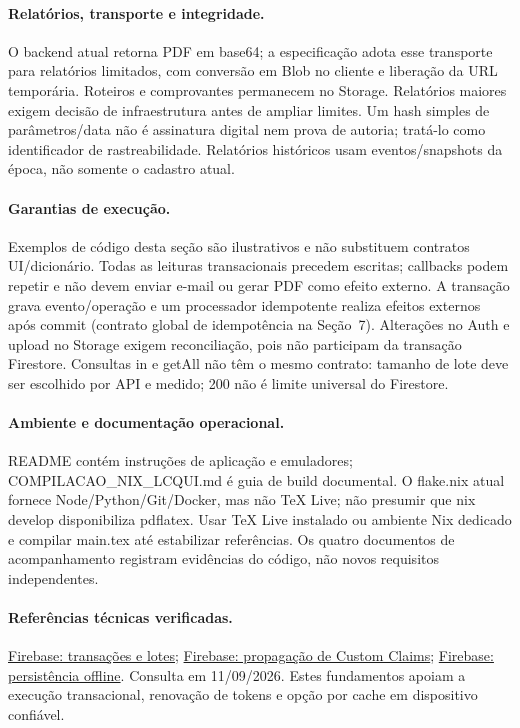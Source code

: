 \paragraph{Relatórios, transporte e integridade.}
O backend atual retorna PDF em base64; a especificação adota esse transporte para relatórios limitados, com conversão em Blob no cliente e liberação da URL temporária. Roteiros e comprovantes permanecem no Storage. Relatórios maiores exigem decisão de infraestrutura antes de ampliar limites. Um hash simples de parâmetros/data não é assinatura digital nem prova de autoria; tratá-lo como identificador de rastreabilidade. Relatórios históricos usam eventos/snapshots da época, não somente o cadastro atual.

\paragraph{Garantias de execução.}
Exemplos de código desta seção são ilustrativos e não substituem contratos UI/dicionário. Todas as leituras transacionais precedem escritas; callbacks podem repetir e não devem enviar e-mail ou gerar PDF como efeito externo. A transação grava evento/operação e um processador idempotente realiza efeitos externos após commit (contrato global de idempotência na Seção~7). Alterações no Auth e upload no Storage exigem reconciliação, pois não participam da transação Firestore. Consultas in e getAll não têm o mesmo contrato: tamanho de lote deve ser escolhido por API e medido; 200 não é limite universal do Firestore.

\paragraph{Ambiente e documentação operacional.}
README contém instruções de aplicação e emuladores; COMPILACAO\_NIX\_LCQUI.md é guia de build documental. O flake.nix atual fornece Node/Python/Git/Docker, mas não TeX Live; não presumir que nix develop disponibiliza pdflatex. Usar TeX Live instalado ou ambiente Nix dedicado e compilar main.tex até estabilizar referências. Os quatro documentos de acompanhamento registram evidências do código, não novos requisitos independentes.

\paragraph{Referências técnicas verificadas.}
\href{https://firebase.google.com/docs/firestore/manage-data/transactions}{Firebase: transações e lotes};
\href{https://firebase.google.com/docs/auth/admin/custom-claims}{Firebase: propagação de Custom Claims};
\href{https://firebase.google.com/docs/firestore/manage-data/enable-offline}{Firebase: persistência offline}.
Consulta em 11/09/2026. Estes fundamentos apoiam a execução transacional, renovação de tokens e opção por cache em dispositivo confiável.

